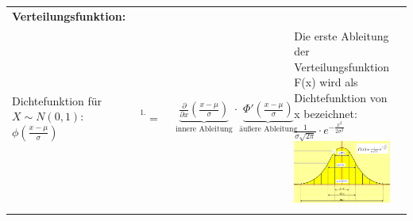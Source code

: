 \begin{longtabu}to
	{\bfseries Verteilungsfunktion:}\\
	Dichtefunktion für $X\sim N(0,1)$: $\phi(\frac{x-\mu}{\sigma})$
	&$\stackrel{\text{1. Abltg.}}{=}$&
	$
	\underbrace{\frac{\partial}{\partial x}\left( \frac{x-\mu}{\sigma}
	\right)}_{\text{innere Ableitung}} \cdot \underbrace{\Phi'\left( \frac{x-\mu}{\sigma}
	\right)}_{\text{äußere Ableitung}}
	$&
	Die erste Ableitung der Verteilungsfunktion F(x) wird als
	 Dichtefunktion von x bezeichnet: $\frac{1}{\sigma\sqrt{2\pi}}\cdot e^{-\frac{x^2}{2\sigma^2}}$\vspace{3ex}
	\includegraphics[width=28ex]{./sources/normvert_funkt_dichte}\\\\


\end{longtabu}
